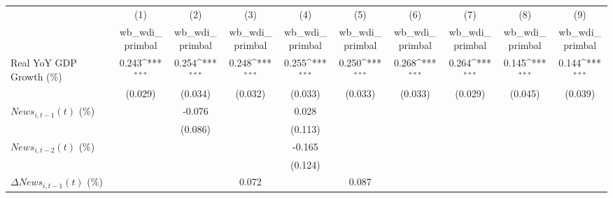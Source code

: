 {
\def\sym#1{\ifmmode^{#1}\else\(^{#1}\)\fi}
\begin{tabular}{l*{9}{c}}
\toprule
                    &\multicolumn{1}{c}{(1)}&\multicolumn{1}{c}{(2)}&\multicolumn{1}{c}{(3)}&\multicolumn{1}{c}{(4)}&\multicolumn{1}{c}{(5)}&\multicolumn{1}{c}{(6)}&\multicolumn{1}{c}{(7)}&\multicolumn{1}{c}{(8)}&\multicolumn{1}{c}{(9)}\\
                    &\multicolumn{1}{c}{wb_wdi_primbal}&\multicolumn{1}{c}{wb_wdi_primbal}&\multicolumn{1}{c}{wb_wdi_primbal}&\multicolumn{1}{c}{wb_wdi_primbal}&\multicolumn{1}{c}{wb_wdi_primbal}&\multicolumn{1}{c}{wb_wdi_primbal}&\multicolumn{1}{c}{wb_wdi_primbal}&\multicolumn{1}{c}{wb_wdi_primbal}&\multicolumn{1}{c}{wb_wdi_primbal}\\
\midrule
Real YoY GDP Growth (\%)&       0.243\sym{***}&       0.254\sym{***}&       0.248\sym{***}&       0.255\sym{***}&       0.250\sym{***}&       0.268\sym{***}&       0.264\sym{***}&       0.145\sym{***}&       0.144\sym{***}\\
                    &     (0.029)         &     (0.034)         &     (0.032)         &     (0.033)         &     (0.033)         &     (0.033)         &     (0.029)         &     (0.045)         &     (0.039)         \\
\addlinespace
$ News_{i,t-1}(t)$ (\%)&                     &      -0.076         &                     &       0.028         &                     &                     &                     &                     &                     \\
                    &                     &     (0.086)         &                     &     (0.113)         &                     &                     &                     &                     &                     \\
\addlinespace
$ News_{i,t-2}(t)$ (\%)&                     &                     &                     &      -0.165         &                     &                     &                     &                     &                     \\
                    &                     &                     &                     &     (0.124)         &                     &                     &                     &                     &                     \\
\addlinespace
$ \Delta News_{i,t-1}(t)$ (\%)&                     &                     &       0.072         &                     &       0.087         &                     &                     &                     &                     \\

\end{tabular}}
